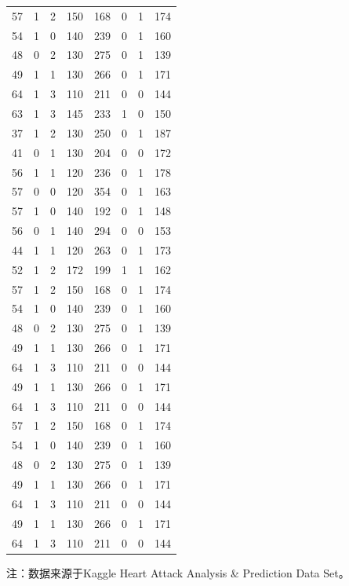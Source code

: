 \begin{small}
\begin{longtable}[c]{c*{7}{r}}
    57 & 1 & 2 & 150 & 168 & 0 & 1 & 174 \\
    54 & 1 & 0 & 140 & 239 & 0 & 1 & 160 \\
    48 & 0 & 2 & 130 & 275 & 0 & 1 & 139 \\
    49 & 1 & 1 & 130 & 266 & 0 & 1 & 171 \\
    64 & 1 & 3 & 110 & 211 & 0 & 0 & 144 \\
    63 & 1 & 3 & 145 & 233 & 1 & 0 & 150 \\
    37 & 1 & 2 & 130 & 250 & 0 & 1 & 187 \\
    41 & 0 & 1 & 130 & 204 & 0 & 0 & 172 \\
    56 & 1 & 1 & 120 & 236 & 0 & 1 & 178 \\
    57 & 0 & 0 & 120 & 354 & 0 & 1 & 163 \\
    57 & 1 & 0 & 140 & 192 & 0 & 1 & 148 \\
    56 & 0 & 1 & 140 & 294 & 0 & 0 & 153 \\
    44 & 1 & 1 & 120 & 263 & 0 & 1 & 173 \\
    52 & 1 & 2 & 172 & 199 & 1 & 1 & 162 \\
    57 & 1 & 2 & 150 & 168 & 0 & 1 & 174 \\
    54 & 1 & 0 & 140 & 239 & 0 & 1 & 160 \\
    48 & 0 & 2 & 130 & 275 & 0 & 1 & 139 \\
    49 & 1 & 1 & 130 & 266 & 0 & 1 & 171 \\
    64 & 1 & 3 & 110 & 211 & 0 & 0 & 144 \\
    49 & 1 & 1 & 130 & 266 & 0 & 1 & 171 \\
    64 & 1 & 3 & 110 & 211 & 0 & 0 & 144 \\
    57 & 1 & 2 & 150 & 168 & 0 & 1 & 174 \\
    54 & 1 & 0 & 140 & 239 & 0 & 1 & 160 \\
    48 & 0 & 2 & 130 & 275 & 0 & 1 & 139 \\
    49 & 1 & 1 & 130 & 266 & 0 & 1 & 171 \\
    64 & 1 & 3 & 110 & 211 & 0 & 0 & 144 \\
    49 & 1 & 1 & 130 & 266 & 0 & 1 & 171 \\
    64 & 1 & 3 & 110 & 211 & 0 & 0 & 144 \\
    \bottomrule[1.5pt]
\end{longtable}
\footnotesize 注：数据来源于Kaggle Heart Attack Analysis \& Prediction Data Set。
\end{small}

